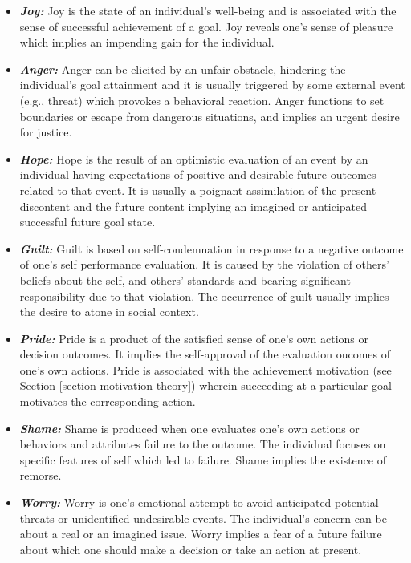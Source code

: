 \documentclass[letterpaper]{article}
\begin{document}
\begin{itemize}
  \item \textbf{\textit{Joy:}} Joy is the state of an individual's well-being
  and is associated with the sense of successful achievement of a goal. Joy
  reveals one's sense of pleasure which implies an impending gain for the
  individual.
  
  \item \textbf{\textit{Anger:}} Anger can be elicited by an unfair obstacle,
  hindering the individual's goal attainment and it is usually triggered by some
  external event (e.g., threat) which provokes a behavioral reaction. Anger
  functions to set boundaries or escape from dangerous situations, and implies
  an urgent desire for justice.
  
  \item \textbf{\textit{Hope:}} Hope is the result of an optimistic evaluation
  of an event by an individual having expectations of positive and desirable
  future outcomes related to that event. It is usually a poignant assimilation
  of the present discontent and the future content implying an imagined or
  anticipated successful future goal state.
  
  \item \textbf{\textit{Guilt:}} Guilt is based on self-condemnation in response
  to a negative outcome of one's self performance evaluation. It is caused by
  the violation of others' beliefs about the self, and others' standards and
  bearing significant responsibility due to that violation. The occurrence of
  guilt usually implies the desire to atone in social context.
  
  \item \textbf{\textit{Pride:}} Pride is a product of the satisfied sense of
  one's own actions or decision outcomes. It implies the self-approval of the
  evaluation oucomes of one's own actions. Pride is associated with the
  achievement motivation (see Section \ref{section-motivation-theory}) wherein
  succeeding at a particular goal motivates the corresponding action.
  
  \item \textbf{\textit{Shame:}} Shame is produced when one evaluates one's own
  actions or behaviors and attributes failure to the outcome. The individual
  focuses on specific features of self which led to failure. Shame implies the
  existence of remorse.
  
  \item \textbf{\textit{Worry:}} Worry is one's emotional attempt to avoid
  anticipated potential threats or unidentified undesirable events. The
  individual's concern can be about a real or an imagined issue. Worry implies a
  fear of a future failure about which one should make a decision or take an
  action at present.
\end{itemize}
\end{document}

